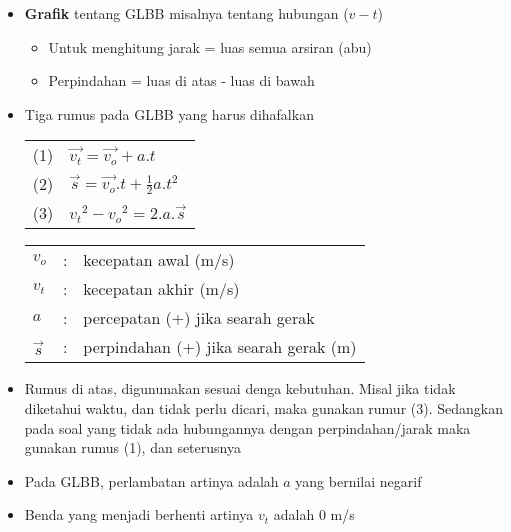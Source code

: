 \documentclass[10pt,a4paper]{article}
\begin{document}
\begin{multicols*}{2}
\begin{itemize}[itemsep=0mm,topsep=0mm,leftmargin=*]
\item \textbf{Grafik} tentang GLBB misalnya tentang hubungan ($v-t$) 
\begin{itemize}[label=*, topsep=0mm, itemsep=0mm]
\item Untuk menghitung jarak = luas semua arsiran (abu)
\item Perpindahan = luas di atas - luas di bawah 
\end{itemize}

\item Tiga rumus pada GLBB yang harus dihafalkan 
\renewcommand{\arraystretch}{1}
\begin{rumus}\begin{tabular}{ll}
(1) &$\vec{v_t}=\vec{v_o} +a.t$ \\
(2) &\phantom{$_t$}$\vec{s} = \vec{v_o}.t + \frac{1}{2}a.t^2$\\
(3) &${v_t}^2-{v_o}^2= 2.a.\vec{s}$\\
\end{tabular}
 

\begin{tabular}{lll}
$v_o$ &:&kecepatan awal (m/s) \\
$v_t$ &:&kecepatan akhir (m/s) \\
$a$ &:& percepatan (+) jika searah gerak\\
$\vec{s}$ &:& perpindahan (+) jika searah gerak (m) \\
\end{tabular}
\end{rumus}
\item Rumus di atas, digununakan sesuai denga kebutuhan. Misal jika tidak diketahui waktu, dan tidak perlu dicari, maka gunakan rumur (3). Sedangkan pada soal yang tidak ada hubungannya dengan perpindahan/jarak maka gunakan rumus (1), dan seterusnya
\item Pada GLBB, perlambatan artinya adalah $a$ yang bernilai negarif

\item Benda yang menjadi berhenti artinya $v_t$ adalah 0 m/s


\end{itemize}
\end{multicols*}
\end{document}
